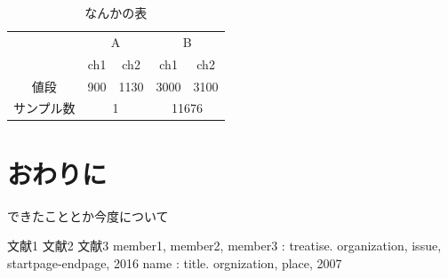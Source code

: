 \documentclass[a4paper,twocolumn,9pt]{jsarticle} %
\begin{document}
\begin{table}[hbtp]
  \caption{なんかの表}
  \label{sample_table}
  \centering
  \begin{tabular}{c|cc|cc}
\hline
    & \multicolumn{2}{c}{A} & \multicolumn{2}{|c}{B} \\
    & ch1 & ch2 & ch1 & ch2 \\
\hline \hline
値段 & 900 & 1130 & 3000 & 3100 \\
サンプル数 & \multicolumn{2}{c}{1} & \multicolumn{2}{|c}{11676} \\
\hline
  \end{tabular}
\end{table}

\section{おわりに}
できたこととか今度について

\begin{thebibliography}{9}
  文献1
  文献2
  文献3
  member1, member2, member3 : treatise. organization, issue, startpage-endpage, 2016
  name : title. orgnization, place, 2007
\end{thebibliography}
\end{document}
